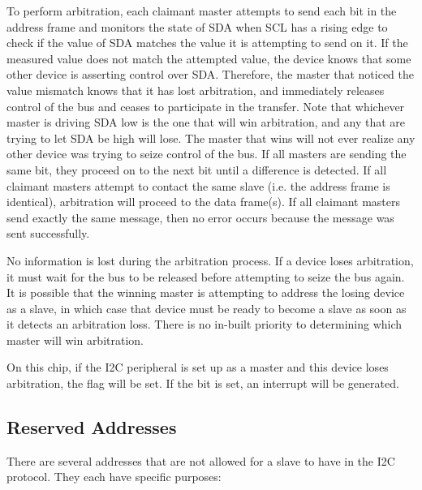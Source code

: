 To perform arbitration, each claimant master attempts to send each bit in the address frame and monitors the state of SDA when SCL has a rising edge to check if the value of SDA matches the value it is attempting to send on it. If the measured value does not match the attempted value, the device knows that some other device is asserting control over SDA. Therefore, the master that noticed the value mismatch knows that it has lost arbitration, and immediately releases control of the bus and ceases to participate in the transfer. Note that whichever master is driving SDA low is the one that will win arbitration, and any that are trying to let SDA be high will lose. The master that wins will not ever realize any other device was trying to seize control of the bus. If all masters are sending the same bit, they proceed on to the next bit until a difference is detected. If all claimant masters attempt to contact the same slave (i.e. the address frame is identical), arbitration will proceed to the data frame(s). If all claimant masters send exactly the same message, then no error occurs because the message was sent successfully.

No information is lost during the arbitration process. If a device loses arbitration, it must wait for the bus to be released before attempting to seize the bus again. It is possible that the winning master is attempting to address the losing device as a slave, in which case that device must be ready to become a slave as soon as it detects an arbitration loss. There is no in-built priority to determining which master will win arbitration.

On this chip, if the I2C peripheral is set up as a master and this device loses arbitration, the  flag will be set. If the  bit is set, an interrupt will be generated.



\subsection{Reserved Addresses}

There are several addresses that are not allowed for a slave to have in the I2C protocol. They each have specific purposes:

